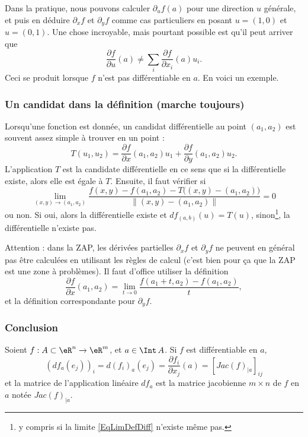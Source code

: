 Dans la pratique, nous pouvons calculer \( \partial_uf(a)\) pour une direction \( u\) générale, et puis en déduire \( \partial_xf\) et \( \partial_yf\) comme cas particuliers en posant \( u=(1,0)\) et \( u=(0,1)\). Une chose incroyable, mais pourtant possible est qu'il peut arriver que
\begin{equation}
	\frac{ \partial f }{ \partial u }(a)\neq \sum_i\frac{ \partial f }{ \partial x_i }(a)u_i.
\end{equation}
Ceci se produit lorsque \( f\) n'est pas différentiable en \( a\). En voici un exemple.

\subsubsection{Un candidat dans la définition (marche toujours)}

Lorsqu'une fonction est donnée, un candidat différentielle au point \( (a_1,a_2)\) est souvent assez simple à trouver en un point :
\begin{equation}
	T(u_1,u_2)=\frac{ \partial f }{ \partial x }(a_1,a_2)u_1+\frac{ \partial f }{ \partial y }(a_1,a_2)u_2.
\end{equation}
L'application \( T\) est la candidate différentielle en ce sens que si la différentielle existe, alors elle est égale à \( T\). Ensuite, il faut vérifier si
\begin{equation}        \label{EqLimDefDiff}
	\lim_{(x,y)\to (a_1,a_2)} \frac{f(x,y) - f(a_1,a_2) - T\big( (x,y)-(a_1,a_2) \big)}{\| (x,y)-(a_1,a_2) \|}=0
\end{equation}
ou non. Si oui, alors la différentielle existe et \( df_{(a,b)}(u)=T(u)\), sinon\footnote{y compris si la limite \eqref{EqLimDefDiff} n'existe même pas.}, la différentielle n'existe pas.

Attention : dans la ZAP, les dérivées partielles \( \partial_xf\) et \( \partial_yf\) ne peuvent en général pas être calculées en utilisant les règles de calcul (c'est bien pour ça que la ZAP est une zone à problèmes). Il faut d'office utiliser la définition
\begin{equation}
	\frac{ \partial f }{ \partial x }(a_1,a_2)=\lim_{t\to 0}\frac{ f(a_1+t,a_2)-f(a_1,a_2) }{ t },
\end{equation}
et la définition correspondante pour \( \partial_yf\).

\subsubsection*{Conclusion}
Soient \( f:A\subset \eR^n \rightarrow \eR^m\), et \( a\in \Int\,A\). Si \( f\) est différentiable en \( a\),
\begin{equation}
	(df_a (e_j))_i = d(f_i)_a(e_j) =\frac{\partial f_i}{\partial x_j}(a)= [Jac(f)_{|a}]_{ij}
\end{equation}
et la matrice de l'application linéaire \( df_a\) est la matrice jacobienne \( m\times n\) de \( f\) en \( a\) notée \( Jac(f)_{|a}\).

